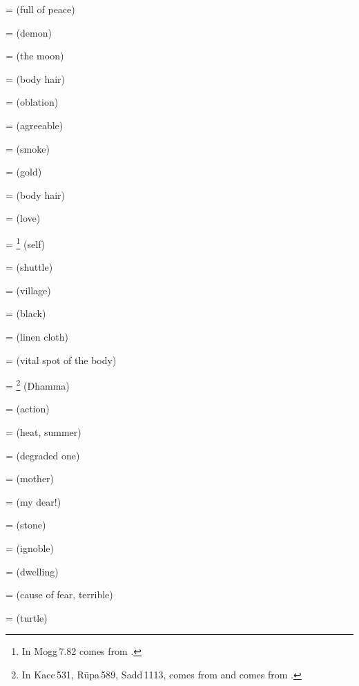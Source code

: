 =  (full of peace)\par
{} =  (demon)\par
{} =  (the moon)\par
{} =  (body hair)\par
{} =  (oblation)\par
{} =  (agreeable)\par
{} =  (smoke)\par
{} =  (gold)\par
{} =  (body hair)\par
{} =  (love)\par
{} = \footnote{In Mogg\,7.82  comes from .} (self)\par
{} =  (shuttle)\par
{} =  (village)\par
{} =  (black)\par
{} =  (linen cloth)\par
{} =  (vital spot of the body)\par
{} = \footnote{In Kacc\,531, R\=upa\,589, Sadd\,1113,  comes from  and  comes from .} (Dhamma)\par
{} =  (action)\par
{} =  (heat, summer)\par
{} =  (degraded one)\par
{} =  (mother)\par
{} =  (my dear!)\par
{} =  (stone)\par
{} =  (ignoble)\par
{} =  (dwelling)\par
{} =  (cause of fear, terrible)\par
{} =  (turtle)\par

